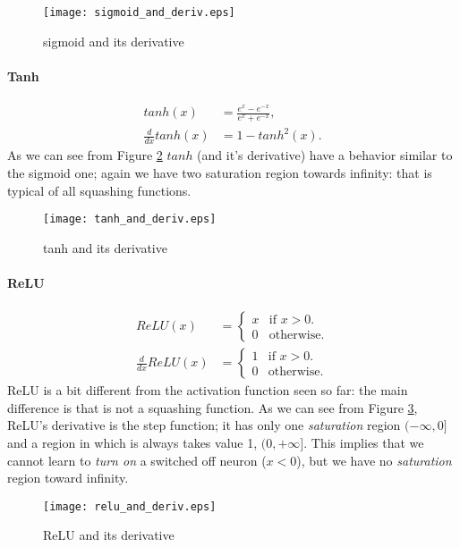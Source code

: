 \begin{figure}[ht]
  \centering
    \texttt{[image: sigmoid\_and\_deriv.eps]}
  \caption{sigmoid and its derivative}
\label{sigmoid_plot}
\end{figure}

\paragraph{Tanh}
\begin{align}
 tanh(x)&=\frac{e^x-e^{-x}}{e^x+e^{-x}}, \\
 \frac{d}{dx}tanh(x)&= 1 - tanh^2(x).  
\end{align}
As we can see from Figure \ref{tanh_plot} $tanh$ (and it's derivative) have a behavior similar to the sigmoid one; again we have two saturation region towards
infinity: that is typical of all squashing functions.



\begin{figure}[ht]
  \centering
    \texttt{[image: tanh\_and\_deriv.eps]}
  \caption{tanh and its derivative}
\label{tanh_plot}
\end{figure}



\paragraph{ReLU}


\begin{align}
  ReLU(x)&=\begin{cases}
    x & \text{if $x>0$}.\\
    0 & \text{otherwise}.
  \end{cases} \\ 
   \frac{d}{dx}ReLU(x)&=\begin{cases}
    1 & \text{if $x>0$}.\\
    0 & \text{otherwise}.
  \end{cases}
\end{align}
ReLU is a bit different from the activation function seen so far: the main difference is that is not a squashing function.
As we can see from Figure \ref{relu_plot}, ReLU's derivative is the step function; it has only one \textit{saturation} region $(-\infty, 0]$ and a region in which is always takes value 1, $(0,+\infty]$.
This implies that we cannot learn to \textit{turn on} a switched off neuron ($x<0$), but we have no \textit{saturation} region toward infinity.

\begin{figure}[ht]
  \centering
    \texttt{[image: relu\_and\_deriv.eps]}
  \caption{ReLU and its derivative}
\label{relu_plot}
\end{figure}
